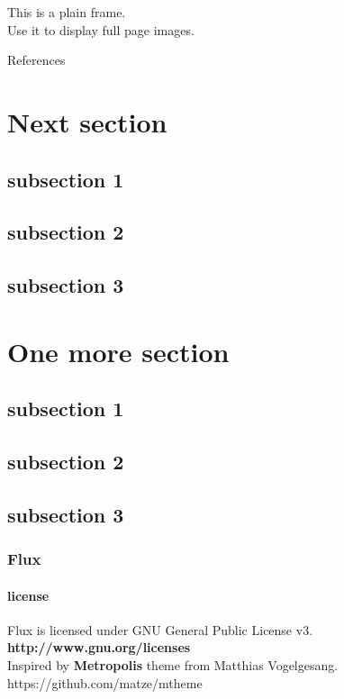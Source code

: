 \documentclass[9pt]{beamer}
\begin{document}
\begin{frame}[plain]
	\begin{center}
	  This is a plain frame.\\
	  Use it to display full page images.
	  \end{center}
\end{frame}

\begin{frame}[allowframebreaks]{References}

  \nocite{*}
  
  

\end{frame}

\section{Next section}
\subsection{subsection 1}
\subsection{subsection 2}
\subsection{subsection 3}
\section{One more section}
\subsection{subsection 1}
\subsection{subsection 2}
\subsection{subsection 3}

\begin{frame}
 \centering
 \frametitle{Flux}
 \framesubtitle{license}
 Flux is licensed under GNU General Public License v3.\\[0.3cm]
 	\centering\textbf{http://www.gnu.org/licenses}\\[0.3cm]
Inspired by \textbf{Metropolis} theme from Matthias Vogelgesang.\\
https://github.com/matze/mtheme 
 
\end{frame}
\end{document}
